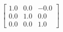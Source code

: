 \documentclass[preview]{standalone}
\begin{document}
\begin{align*}
\left[ \begin{array}{ccc}1.0 & 0.0 & -0.0 \\ 0.0 & 1.0 & 0.0 \\ 0.0 & 0.0 & 1.0\end{array} \right]
\end{align*}
\end{document}
